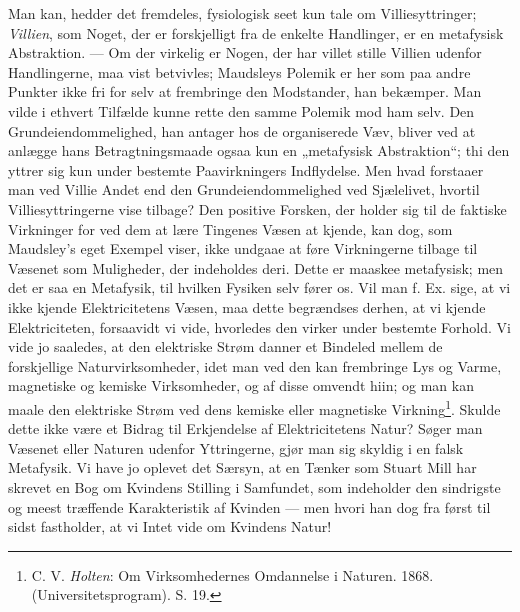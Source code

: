 \documentclass[12pt,a4paper,openany]{book}
\newcommand{\opage}[1]{\marginnote{\footnotesize\textit{[#1]}}}
\begin{document}
Man kan, hedder det fremdeles, fysiologisk seet kun
tale om Villiesyttringer; \emph{Villien}, som Noget, der er forskjelligt
fra de enkelte Handlinger, er en metafysisk Abstraktion.
--- Om der virkelig er Nogen, der har villet stille
Villien udenfor Handlingerne, maa vist betvivles; Maudsleys
Polemik er her som paa andre Punkter ikke fri for selv
at frembringe den Modstander, han bekæmper. Man vilde
i ethvert Tilfælde kunne rette den samme Polemik mod ham
selv. Den Grundeiendommelighed, han antager hos de
organiserede Væv, bliver ved at anlægge hans Betragtningsmaade
ogsaa kun en „metafysisk Abstraktion“; thi den yttrer
sig kun under bestemte Paavirkningers Indflydelse. Men
hvad forstaaer man ved Villie Andet end den Grundeiendommelighed
ved Sjælelivet, hvortil Villiesyttringerne vise
tilbage? Den positive Forsken, der holder sig til de faktiske
Virkninger for ved dem at lære Tingenes Væsen at kjende,
kan dog, som Maudsley's eget Exempel viser, ikke undgaae
at føre Virkningerne tilbage til Væsenet som Muligheder,
der indeholdes deri. Dette er maaskee metafysisk; men det
er saa en Metafysik, til hvilken Fysiken selv fører os. Vil
man f. Ex. sige, at vi ikke kjende Elektricitetens Væsen,
maa dette begrændses derhen, at vi kjende Elektriciteten,
forsaavidt vi vide, hvorledes den virker under bestemte Forhold.
Vi vide jo saaledes, at den elektriske Strøm danner
et Bindeled mellem de forskjellige Naturvirksomheder, idet
man ved den kan frembringe Lys og Varme, magnetiske og
kemiske Virksomheder, og af disse omvendt hiin; og man
kan maale den elektriske Strøm ved dens kemiske eller magnetiske
Virkning\footnote{C. V. \emph{Holten}: Om Virksomhedernes Omdannelse i Naturen. 1868. (Universitetsprogram). S. 19.}. Skulde dette ikke være et Bidrag til
Erkjendelse af Elektricitetens Natur? Søger man Væsenet
\opage{322}eller Naturen udenfor Yttringerne, gjør man sig skyldig
i en falsk Metafysik. Vi have jo oplevet det Særsyn, at en
Tænker som Stuart Mill har skrevet en Bog om Kvindens
Stilling i Samfundet, som indeholder den sindrigste og meest
træffende Karakteristik af Kvinden --- men hvori han dog
fra først til sidst fastholder, at vi Intet vide om Kvindens
Natur!
\end{document}
